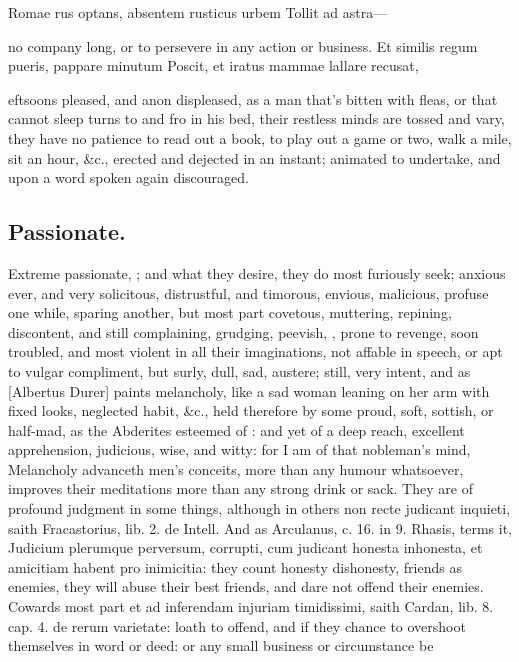 {Romae rus optans, absentem rusticus urbem
Tollit ad astra---

no company long, or to persevere in any action or business.
Et similis regum pueris, pappare minutum
Poscit, et iratus mammae lallare recusat,

eftsoons pleased, and anon displeased, as a man that's bitten with
fleas, or that cannot sleep turns to and fro in his bed, their restless
minds are tossed and vary, they have no patience to read out a book, to
play out a game or two, walk a mile, sit an hour, \&c., erected and
dejected in an instant; animated to undertake, and upon a word spoken
again discouraged.

\subsection{Passionate.}
Extreme passionate, ; and
what they desire, they do most furiously seek; anxious ever, and very
solicitous, distrustful, and timorous, envious, malicious, profuse one
while, sparing another, but most part covetous, muttering, repining,
discontent, and still complaining, grudging, peevish, , prone to revenge, soon troubled, and most violent in all their
imaginations, not affable in speech, or apt to vulgar compliment, but
surly, dull, sad, austere;  still, very intent, and as
[Albertus Durer] paints melancholy, like a sad woman leaning on
her arm with fixed looks, neglected habit, \&c., held therefore by some
proud, soft, sottish, or half-mad, as the Abderites esteemed of
\Democritus{}: and yet of a deep reach, excellent apprehension, judicious,
wise, and witty: for I am of that nobleman's mind, Melancholy
advanceth men's conceits, more than any humour whatsoever, improves
their meditations more than any strong drink or sack. They are of
profound judgment in some things, although in others non recte judicant
inquieti, saith Fracastorius, lib. 2. de Intell. And as Arculanus, c.
16. in 9. Rhasis, terms it, Judicium plerumque perversum, corrupti, cum
judicant honesta inhonesta, et amicitiam habent pro inimicitia: they
count honesty dishonesty, friends as enemies, they will abuse their
best friends, and dare not offend their enemies. Cowards most part et
ad inferendam injuriam timidissimi, saith Cardan, lib. 8. cap. 4. de
rerum varietate: loath to offend, and if they chance to overshoot
themselves in word or deed: or any small business or circumstance be
}
